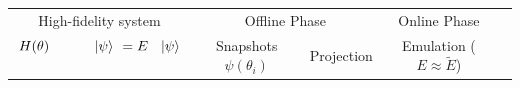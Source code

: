 \documentclass[10pt, margin=1mm,convert={density=500,outext=.png}]{standalone}
\begin{document}
\small
\begin{tabular}{ccccc}
\toprule

High-fidelity system  & \multicolumn{2}{c}{Offline Phase} & Online Phase\\
\cmidrule(lr){1-1}\cmidrule(lr){2-3}\cmidrule(lr){4-4}

\hspace{0.45in}$H(\theta)\hspace{0.43in}\ket{\psi}\hspace{0.05in}=E\hspace{0.06in}~\ket{\psi}$~
&
\!\!\!\!Snapshots $\psi(\theta_i)$\!\!\!\!\!\!\!\!%
& Projection
& Emulation ($E \approx \widetilde E$)
\\[2pt]



\end{tabular}
\end{document}
